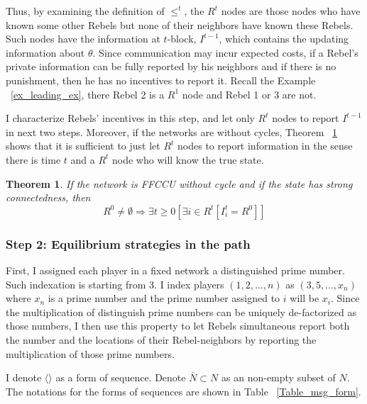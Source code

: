 \documentclass[12pt,letter]{article}
\newtheorem{theorem}{Theorem}
\theoremstyle{definition}
\theoremstyle{remark}
\theoremstyle{claim}
\begin{document}
Thus, by examining the definition of $\leq^t$, the $R^t$ nodes are those nodes who have known some other Rebels but none of their neighbors have known these Rebels. Such nodes have the information at $t$-block, $I^{t-1}$, which contains the updating information about $\theta$. Since communication may incur expected costs, if a Rebel's private information can be fully reported by his neighbors and if there is no punishment, then he has no incentives to report it. Recall the Example ~\ref{ex_leading_ex}, there Rebel 2 is a $R^1$ node and Rebel 1 or 3 are not.

I characterize Rebels' incentives in this step, and let only $R^t$ nodes to report $I^{t-1}$ in next two steps. Moreover, if the networks are without cycles, Theorem ~\ref{lemma_empty} shows that it is sufficient to just let $R^t$ nodes to report information in the sense there is time $t$ and a $R^t$ node who will know the true state. 
\begin{theorem}
\label{lemma_empty}
If the network is FFCCU without cycle and if the state has strong connectedness, then 
\[R^0\neq \emptyset \Rightarrow \exists t\geq 0[\exists i\in R^t[I^t_i=R^0]]\]
\end{theorem}



\subsubsection{Step 2: Equilibrium strategies in the path}


First, I assigned each player in a fixed network a distinguished prime number. Such indexation is starting from $3$. I index players $(1,2,...,n)$ as $(3,5,...,x_n)$ where $x_n$ is a prime number and the prime number assigned to $i$ will be $x_i$. Since the multiplication of distinguish prime numbers can be uniquely de-factorized as those numbers, I then use this property to let Rebels simultaneous report both the number and the locations of their Rebel-neighbors by reporting the multiplication of those prime numbers.

I denote $\langle\rangle$ as a form of sequence. Denote $\bar{N}\subset N$ as an non-empty subset of $N$. The notations for the forms of sequences are shown in Table ~\ref{Table_msg_form}. 
\end{document}
